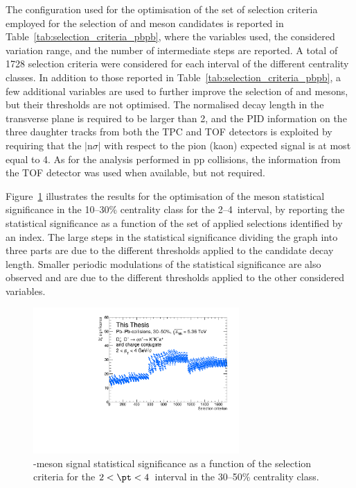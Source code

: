 The configuration used for the optimisation of the set of selection criteria employed for the selection of \ds and \dpl meson candidates is reported in Table~\ref{tab:selection_criteria_pbpb}, where the variables used, the considered variation range, and the number of intermediate steps are reported. A total of 1728 selection criteria were considered for each \pt interval of the different centrality classes. In addition to those reported in Table~\ref{tab:selection_criteria_pbpb}, a few additional variables are used to further improve the selection of \ds and \dpl mesons, but their thresholds are not optimised. The normalised decay length in the transverse plane is required to be larger than 2, and the PID information on the three daughter tracks from both the TPC and TOF detectors is exploited by requiring that the $\lvert\mathrm{n}\sigma\rvert$ with respect to the pion (kaon) expected signal is at most equal to 4. As for the analysis performed in pp collisions, the information from the TOF detector was used when available, but not required. 

Figure~\ref{fig:signif_scan_pbpb} illustrates the results for the optimisation of the \ds meson statistical significance in the 10--30\% centrality class for the 2--4~\gevc \pt interval, by reporting the statistical significance as a function of the set of applied selections identified by an index. The large steps in the statistical significance dividing the graph into three parts are due to the different thresholds applied to the candidate decay length. Smaller periodic modulations of the \ds statistical significance are also observed and are due to the different thresholds applied to the other considered variables.

\begin{figure}[htb]
    \centering
    \includegraphics[width=0.7\textwidth]{Figures/Chapter 8/SignificanceScan.pdf}
    \caption{\ds-meson signal statistical significance as a function of the selection criteria for the $2<\pt<4$~\gevc interval in the 30--50\% centrality class.}
    \label{fig:signif_scan_pbpb}
\end{figure}

